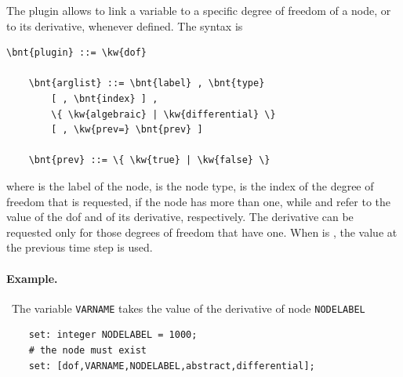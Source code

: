 The  plugin allows to link a variable to a specific degree of freedom
of a node, or to its derivative, whenever defined.
The syntax is
\begin{Verbatim}[commandchars=\\\{\}]
    \bnt{plugin} ::= \kw{dof}

    \bnt{arglist} ::= \bnt{label} , \bnt{type}
        [ , \bnt{index} ] ,
        \{ \kw{algebraic} | \kw{differential} \}
        [ , \kw{prev=} \bnt{prev} ]

    \bnt{prev} ::= \{ \kw{true} | \kw{false} \}
\end{Verbatim}
where
 is the label of the node,
 is the node type,
 is the index of the degree of freedom that is requested,
if the node has more than one, while
 and  refer to the value of the dof
and of its derivative, respectively.
The derivative can be requested only for those degrees of freedom
that have one.
When  is , the value at the previous time step is used.

\paragraph{Example.} \
The variable \texttt{VARNAME} takes the value of the derivative
of  node \texttt{NODELABEL}
\begin{verbatim}
    set: integer NODELABEL = 1000;
    # the node must exist
    set: [dof,VARNAME,NODELABEL,abstract,differential];
\end{verbatim}




